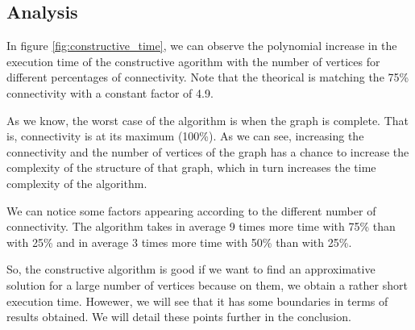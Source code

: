 
\subsection{Analysis}

In figure \ref{fig:constructive_time}, we can observe the polynomial increase in the execution time of the constructive agorithm with the number of vertices for different percentages of connectivity. Note that the theorical is matching the 75\% connectivity with a constant factor of 4.9.
\bigskip

As we know, the worst case of the algorithm is when the graph is complete. That is, connectivity is at its maximum (100\%). As we can see, increasing the connectivity and the number of vertices of the graph has a chance to increase the complexity of the structure of that graph, which in turn increases the time complexity of the algorithm. 
\newpage

We can notice some factors appearing according to the different number of connectivity. The algorithm takes in average 9 times more time with 75\% than with 25\% and in average 3 times more time with 50\% than with 25\%.
\bigskip

So, the constructive algorithm is good if we want to find an approximative solution for a large number of vertices because on them, we obtain a rather short execution time. Howewer, we will see that it has some boundaries in terms of results obtained. We will detail these points further in the conclusion.